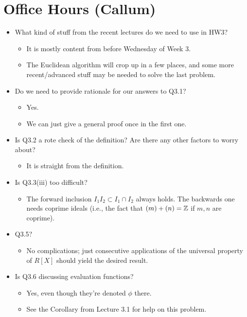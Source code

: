 \documentclass[../notes.tex]{subfiles}
\begin{document}
\section{Office Hours (Callum)}
\begin{itemize}
    \item What kind of stuff from the recent lectures do we need to use in HW3?
    \begin{itemize}
        \item It is mostly content from before Wednesday of Week 3.
        \item The Euclidean algorithm will crop up in a few places, and some more recent/advanced stuff may be needed to solve the last problem.
    \end{itemize}
    \item Do we need to provide rationale for our answers to Q3.1?
    \begin{itemize}
        \item Yes.
        \item We can just give a general proof once in the first one.
    \end{itemize}
    \item Is Q3.2 a rote check of the definition? Are there any other factors to worry about?
    \begin{itemize}
        \item It is straight from the definition.
    \end{itemize}
    \item Is Q3.3(iii) too difficult?
    \begin{itemize}
        \item The forward inclusion $I_1I_2\subset I_1\cap I_2$ always holds. The backwards one needs coprime ideals (i.e., the fact that $(m)+(n)=\mathbb{Z}$ if $m,n$ are coprime).
    \end{itemize}
    \item Q3.5?
    \begin{itemize}
        \item No complications; just consecutive applications of the universal property of $R[X]$ should yield the desired result.
    \end{itemize}
    \item Is Q3.6 discussing evaluation functions?
    \begin{itemize}
        \item Yes, even though they're denoted $\phi$ there.
        \item See the Corollary from Lecture 3.1 for help on this problem.

\end{itemize}
\end{itemize}
\end{document}
